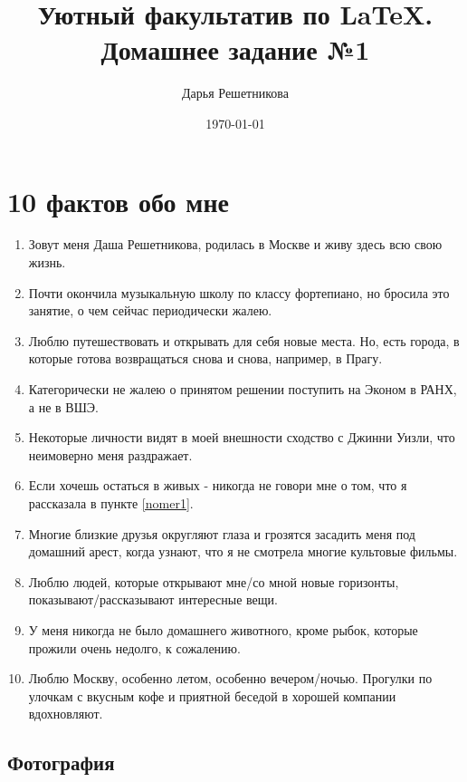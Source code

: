 \documentclass[12pt, a4paper]{article}
\title{Уютный факультатив по \LaTeX. Домашнее задание №1 }
\author{Дарья Решетникова}
\date{\today}
\begin{document}
 


\maketitle

\section{10 фактов обо мне}

\begin{enumerate}
	\item Зовут меня Даша Решетникова, родилась в Москве и живу здесь всю свою жизнь.
	\item Почти окончила музыкальную школу по классу фортепиано, но бросила это занятие, о чем сейчас периодически жалею.
	\item Люблю путешествовать и открывать для себя новые места. Но, есть города, в которые  готова возвращаться снова и снова, например, в Прагу.
	\item Категорически не жалею о принятом решении поступить на Эконом в РАНХ, а не в ВШЭ.
	\item Некоторые личности видят в моей внешности сходство с Джинни Уизли, что неимоверно меня раздражает\label{nomer1}.
	\item Если хочешь остаться в живых - никогда не говори мне о том, что я рассказала в пункте \ref{nomer1}.
	\item Многие близкие друзья округляют глаза и грозятся засадить меня под домашний арест, когда узнают, что я не смотрела многие культовые фильмы.
	\item Люблю людей, которые открывают мне/со мной новые горизонты, показывают/рассказывают интересные вещи.
	\item У меня никогда не было домашнего животного, кроме рыбок, которые прожили очень недолго, к сожалению.
	\item Люблю Москву, особенно летом, особенно вечером/ночью. Прогулки по улочкам с вкусным кофе и приятной беседой в хорошей компании вдохновляют.
\end{enumerate}

\subsection{Фотография}
\end{document}
